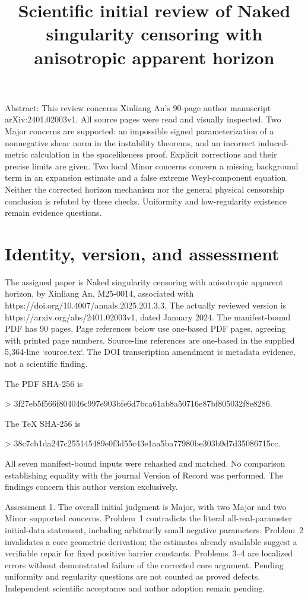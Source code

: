 \documentclass[10pt]{article}
\title{Scientific initial review of
Naked singularity censoring with anisotropic apparent horizon}
\author{}
\date{}
\begin{document}
\maketitle
Abstract: This review concerns Xinliang An’s 90-page author manuscript arXiv:2401.02003v1. All source pages were read and visually inspected. Two Major concerns are supported: an impossible signed parameterization of a nonnegative shear norm in the instability theorems, and an incorrect induced-metric calculation in the spacelikeness proof. Explicit corrections and their precise limits are given. Two local Minor concerns concern a missing background term in an expansion estimate and a false extreme Weyl-component equation. Neither the corrected horizon mechanism nor the general physical censorship conclusion is refuted by these checks. Uniformity and low-regularity existence remain evidence questions.\par
\section*{Identity, version, and assessment}
The assigned paper is Naked singularity censoring with anisotropic apparent horizon, by Xinliang An, M25-0014, associated with https://doi.org/10.4007/annals.2025.201.3.3. The actually reviewed version is https://arxiv.org/abs/2401.02003v1, dated January 2024. The manifest-bound PDF has 90 pages. Page references below use one-based PDF pages, agreeing with printed page numbers. Source-line references are one-based in the supplied 5,364-line `source.tex`. The DOI transcription amendment is metadata evidence, not a scientific finding.\par
The PDF SHA-256 is\par
> 3f27eb5f566f804046c997e903bfe6d7bca61ab8a50716e87bf805032f8e8286.\par
The TeX SHA-256 is\par
> 38c7cb1da247c255145489e0f3d55c43e1aa5ba77980be303b9d7d35086715cc.\par
All seven manifest-bound inputs were rehashed and matched. No comparison establishing equality with the journal Version of Record was performed. The findings concern this author version exclusively.\par
Assessment 1.  The overall initial judgment is Major, with two Major and two Minor supported concerns. Problem 1 contradicts the literal all-real-parameter initial-data statement, including arbitrarily small negative parameters. Problem 2 invalidates a core geometric derivation; the estimates already available suggest a verifiable repair for fixed positive barrier constants. Problems 3–4 are localized errors without demonstrated failure of the corrected core argument. Pending uniformity and regularity questions are not counted as proved defects. Independent scientific acceptance and author adoption remain pending.\par
\end{document}
